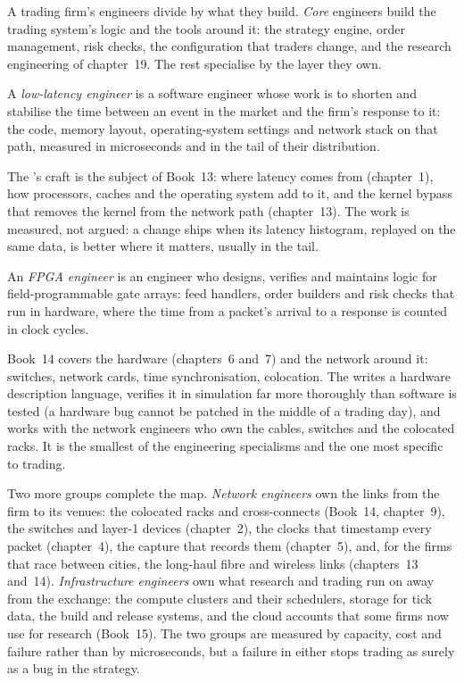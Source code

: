 A trading firm's engineers divide by what they build. \emph{Core} engineers build the trading system's logic and the
tools around it: the strategy engine, order management, risk checks, the configuration that traders change, and the
research engineering of chapter~19. The rest specialise by the layer they own.

\begin{definition}\label{def:in:software-engineer:lowlat}
A \emph{low-latency engineer} is a software engineer whose work is to shorten and stabilise the
time between an event in the market and the firm's response to it: the code, memory layout, operating-system settings
and network stack on that path, measured in microseconds and in the tail of their distribution.
\end{definition}

The 's craft is the subject of Book~13: where latency comes from (chapter~1), how processors, caches
and the operating system add to it, and the kernel bypass that removes the kernel from the network path (chapter~13).
The work is measured, not argued: a change ships when its latency histogram, replayed on the same data, is better where
it matters, usually in the tail.

\begin{definition}\label{def:in:software-engineer:fpga}
An \emph{FPGA engineer} is an engineer who designs, verifies and maintains logic for
field-programmable gate arrays: feed handlers, order builders and risk checks that run in hardware, where the time from a
packet's arrival to a response is counted in clock cycles.
\end{definition}

Book~14 covers the hardware (chapters~6 and~7) and the network around it: switches, network cards, time
synchronisation, colocation. The  writes a hardware description language, verifies it in simulation far
more thoroughly than software is tested (a hardware bug cannot be patched in the middle of a trading day), and works with
the network engineers who own the cables, switches and the colocated racks. It is the smallest of the engineering
specialisms and the one most specific to trading.

Two more groups complete the map. \emph{Network engineers} own the links from the firm to its venues: the colocated
racks and cross-connects (Book~14, chapter~9), the switches and layer-1 devices (chapter~2), the clocks that timestamp
every packet (chapter~4), the capture that records them (chapter~5), and, for the firms that race between cities, the
long-haul fibre and wireless links (chapters~13 and~14). \emph{Infrastructure engineers} own what research and trading
run on away from the exchange: the compute clusters and their schedulers, storage for tick data, the build and release
systems, and the cloud accounts that some firms now use for research (Book~15). The two groups are measured by capacity,
cost and failure rather than by microseconds, but a failure in either stops trading as surely as a bug in the strategy.

